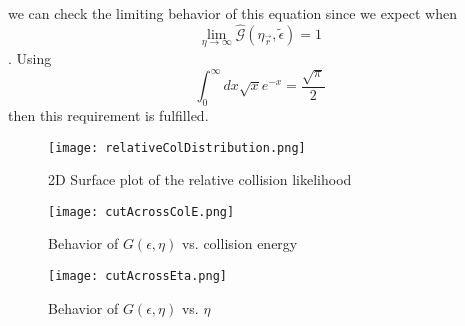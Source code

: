 we can check the limiting behavior of this equation since we expect when $$\lim_{\eta \rightarrow \infty} \hat{\mathcal{G}}(\eta_{\vec{r}}, \tilde{\epsilon}) = 1$$. 
Using $$ \int_0^{\infty} dx \sqrt{x} e^{-x} = \frac{\sqrt{\pi}}{2}$$ then this requirement is fulfilled. 


\begin{figure}
\label{fig:momSurfRelCol}
	\centerline{
	\texttt{[image: relativeColDistribution.png]}}
	\caption{2D Surface plot of the relative collision likelihood}{}
\end{figure} 
\begin{figure}
\label{fig:momSurfRelCol}
	\centerline{
	\texttt{[image: cutAcrossColE.png]}}
	\caption{Behavior of $G(\epsilon,\eta)$ vs. collision energy}{}
\end{figure} 
\begin{figure}
\label{fig:momSurfRelCol}
	\centerline{
	\texttt{[image: cutAcrossEta.png]}}
	\caption{Behavior of $G(\epsilon,\eta)$ vs. $\eta$}{}
\end{figure} 



